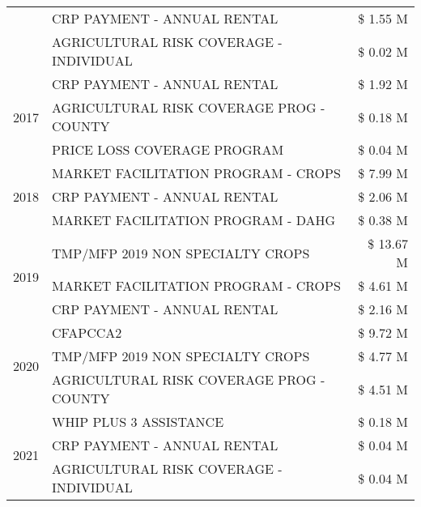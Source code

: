 \begin{tabular}{llr}
 & CRP PAYMENT - ANNUAL RENTAL                   & \$ 1.55 M \\
 & AGRICULTURAL RISK COVERAGE - INDIVIDUAL       & \$ 0.02 M \\
\cline{1-3}
\multirow[t]{3}{*}{2017} & CRP PAYMENT - ANNUAL RENTAL & \$ 1.92 M \\
 & AGRICULTURAL RISK COVERAGE PROG - COUNTY & \$ 0.18 M \\
 & PRICE LOSS COVERAGE PROGRAM & \$ 0.04 M \\
\cline{1-3}
\multirow[t]{3}{*}{2018} & MARKET FACILITATION PROGRAM - CROPS & \$ 7.99 M \\
 & CRP PAYMENT - ANNUAL RENTAL & \$ 2.06 M \\
 & MARKET FACILITATION PROGRAM - DAHG & \$ 0.38 M \\
\cline{1-3}
\multirow[t]{3}{*}{2019} & TMP/MFP 2019 NON SPECIALTY CROPS & \$ 13.67 M \\
 & MARKET FACILITATION PROGRAM - CROPS & \$ 4.61 M \\
 & CRP PAYMENT - ANNUAL RENTAL & \$ 2.16 M \\
\cline{1-3}
\multirow[t]{3}{*}{2020} & CFAPCCA2 & \$ 9.72 M \\
 & TMP/MFP 2019 NON SPECIALTY CROPS & \$ 4.77 M \\
 & AGRICULTURAL RISK COVERAGE PROG - COUNTY & \$ 4.51 M \\
\cline{1-3}
\multirow[t]{3}{*}{2021} & WHIP PLUS 3 ASSISTANCE & \$ 0.18 M \\
 & CRP PAYMENT - ANNUAL RENTAL & \$ 0.04 M \\
 & AGRICULTURAL RISK COVERAGE - INDIVIDUAL & \$ 0.04 M \\
\cline{1-3}
\bottomrule
\end{tabular}
